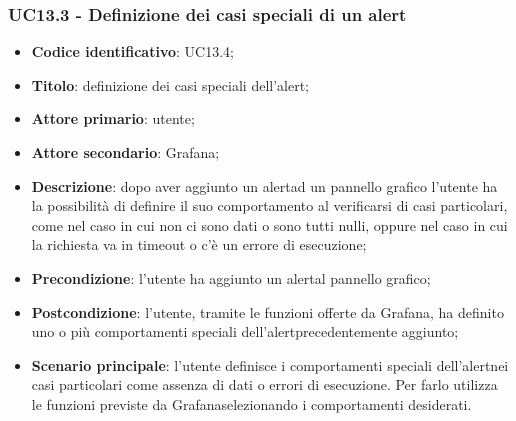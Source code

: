 \subsubsection{UC13.3 - Definizione dei casi speciali di un alert}
	\begin{itemize}
	\item \textbf{Codice identificativo}: UC13.4;
	\item \textbf{Titolo}: definizione dei casi speciali dell'alert\glo;
	\item \textbf{Attore primario}: utente;
	\item \textbf{Attore secondario}: Grafana\glo;
	\item \textbf{Descrizione}: dopo aver aggiunto un alert\glosp ad un pannello grafico l'utente ha la possibilità di definire il suo comportamento al verificarsi di casi particolari, come nel caso in cui non ci sono dati o sono tutti nulli, oppure nel caso in cui la richiesta va in timeout o c'è un errore di esecuzione;
	\item \textbf{Precondizione}: l'utente ha aggiunto un alert\glosp al pannello grafico;
	\item \textbf{Postcondizione}: l'utente, tramite le funzioni offerte da Grafana\glosp, ha definito uno o più comportamenti speciali dell'alert\glosp precedentemente aggiunto;
	\item \textbf{Scenario principale}: l'utente definisce i comportamenti speciali dell'alert\glosp nei casi particolari come assenza di dati o errori di esecuzione. Per farlo utilizza le funzioni previste da Grafana\glosp selezionando i comportamenti desiderati.
\end{itemize} 